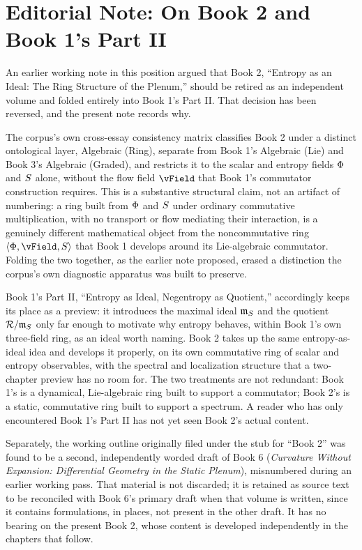 \chapter*{Editorial Note: On Book 2 and Book 1's Part II}

An earlier working note in this position argued that Book 2, ``Entropy as an Ideal: The Ring Structure of the Plenum,'' should be retired as an independent volume and folded entirely into Book 1's Part II. That decision has been reversed, and the present note records why.

The corpus's own cross-essay consistency matrix classifies Book 2 under a distinct ontological layer, Algebraic (Ring), separate from Book 1's Algebraic (Lie) and Book 3's Algebraic (Graded), and restricts it to the scalar and entropy fields $\Phi$ and $S$ alone, without the flow field $\vField$ that Book 1's commutator construction requires. This is a substantive structural claim, not an artifact of numbering: a ring built from $\Phi$ and $S$ under ordinary commutative multiplication, with no transport or flow mediating their interaction, is a genuinely different mathematical object from the noncommutative ring $\langle \PhiField, \vField, \SEntropy \rangle$ that Book 1 develops around its Lie-algebraic commutator. Folding the two together, as the earlier note proposed, erased a distinction the corpus's own diagnostic apparatus was built to preserve.

Book 1's Part II, ``Entropy as Ideal, Negentropy as Quotient,'' accordingly keeps its place as a preview: it introduces the maximal ideal $\mathfrak{m}_{S}$ and the quotient $\mathcal{R}/\mathfrak{m}_{S}$ only far enough to motivate why entropy behaves, within Book 1's own three-field ring, as an ideal worth naming. Book 2 takes up the same entropy-as-ideal idea and develops it properly, on its own commutative ring of scalar and entropy observables, with the spectral and localization structure that a two-chapter preview has no room for. The two treatments are not redundant: Book 1's is a dynamical, Lie-algebraic ring built to support a commutator; Book 2's is a static, commutative ring built to support a spectrum. A reader who has only encountered Book 1's Part II has not yet seen Book 2's actual content.

Separately, the working outline originally filed under the stub for ``Book 2'' was found to be a second, independently worded draft of Book 6 (\emph{Curvature Without Expansion: Differential Geometry in the Static Plenum}), misnumbered during an earlier working pass. That material is not discarded; it is retained as source text to be reconciled with Book 6's primary draft when that volume is written, since it contains formulations, in places, not present in the other draft. It has no bearing on the present Book 2, whose content is developed independently in the chapters that follow.
